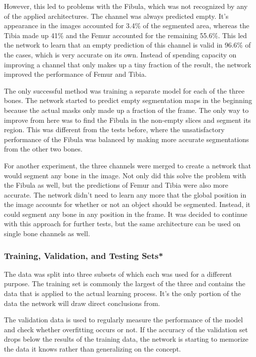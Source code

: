 However, this led to problems with the Fibula, which was not recognized by any of the applied architectures. The channel was always predicted empty. It's appearance in the images accounted for 3.4\% of the segmented area, whereas the Tibia made up 41\% and the Femur accounted for the remaining 55.6\%. This led the network to learn that an empty prediction of this channel is valid in 96.6\% of the cases, which is very accurate on its own. Instead of spending capacity on improving a channel that only makes up a tiny fraction of the result, the network improved the performance of Femur and Tibia.

The only successful method was training a separate model for each of the three bones. The network started to predict empty segmentation maps in the beginning because the actual masks only made up a fraction of the frame. The only way to improve from here was to find the Fibula in the non-empty slices and segment its region. This was different from the tests before, where the unsatisfactory performance of the Fibula was balanced by making more accurate segmentations from the other two bones.

For another experiment, the three channels were merged to create a network that would segment any bone in the image. Not only did this solve the problem with the Fibula as well, but the predictions of Femur and Tibia were also more accurate. The network didn't need to learn any more that the global position in the image accounts for whether or not an object should be segmented. Instead, it could segment any bone in any position in the frame. It was decided to continue with this approach for further tests, but the same architecture can be used on single bone channels as well. 

\subsubsection{Training, Validation, and Testing Sets*}

The data was split into three subsets of which each was used for a different purpose. The training set is commonly the largest of the three and contains the data that is applied to the actual learning process. It's the only portion of the data the network will draw direct conclusions from. 

The validation data is used to regularly measure the performance of the model and check whether overfitting occurs or not. If the accuracy of the validation set drops below the results of the training data, the network is starting to memorize the data it knows rather than generalizing on the concept.


